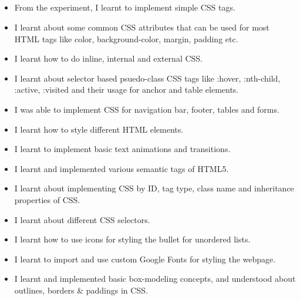 \documentclass[12pt, a4]{article}
\begin{document}
\subsection*{}
\begin{itemize}

\item From the experiment, I learnt to implement simple CSS tags.
\item I learnt about some common CSS attributes that can be used for most HTML tags like color, background-color, margin, padding etc.
\item I learnt how to do inline, internal and external CSS.
\item I learnt about selector based psuedo-class CSS tags like :hover, :nth-child, :active, :visited and their usage for anchor and table elements.
\item I was able to implement CSS for navigation bar, footer, tables and forms.
\item I learnt how to style different HTML elements.
\item I learnt to implement basic text animations and transitions.
\item I learnt and implemented various semantic tags of HTML5.
\item I learnt about implementing CSS by ID, tag type, class name and inheritance properties of CSS.
\item I learnt about different CSS selectors.
\item I learnt how to use icons for styling the bullet for unordered lists.
\item I learnt to import and use custom Google Fonts for styling the webpage.
\item I learnt and implemented basic box-modeling concepts, and understood about outlines, borders \& paddings in CSS.

\end{itemize}
\end{document}
